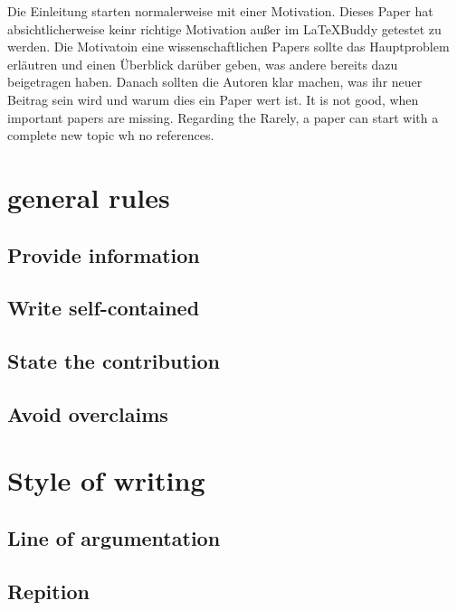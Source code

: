 \documentclass[12pt,a4paper]{article}
\begin{document}
Die Einleitung starten normalerweise mit einer Motivation. Dieses Paper hat absichtlicherweise keinr richtige Motivation außer im \LaTeX{}Buddy getestet zu werden. Die Motivatoin eine wissenschaftlichen Papers sollte das Hauptproblem erläutren und einen Überblick darüber geben, was andere bereits dazu beigetragen haben. Danach sollten die Autoren klar machen, was ihr neuer Beitrag sein wird und warum dies ein Paper wert ist.
It is not good, when important papers are missing. Regarding the Rarely, a paper can start with a complete new topic wh no references.

\section{general rules}%

\subsection{Provide information}
\subsection{Write self-contained}
\subsection{State the contribution}
\subsection{Avoid overclaims}
\section{Style of writing}
\subsection{Line of argumentation}
\subsection{Repition}
\end{document}
